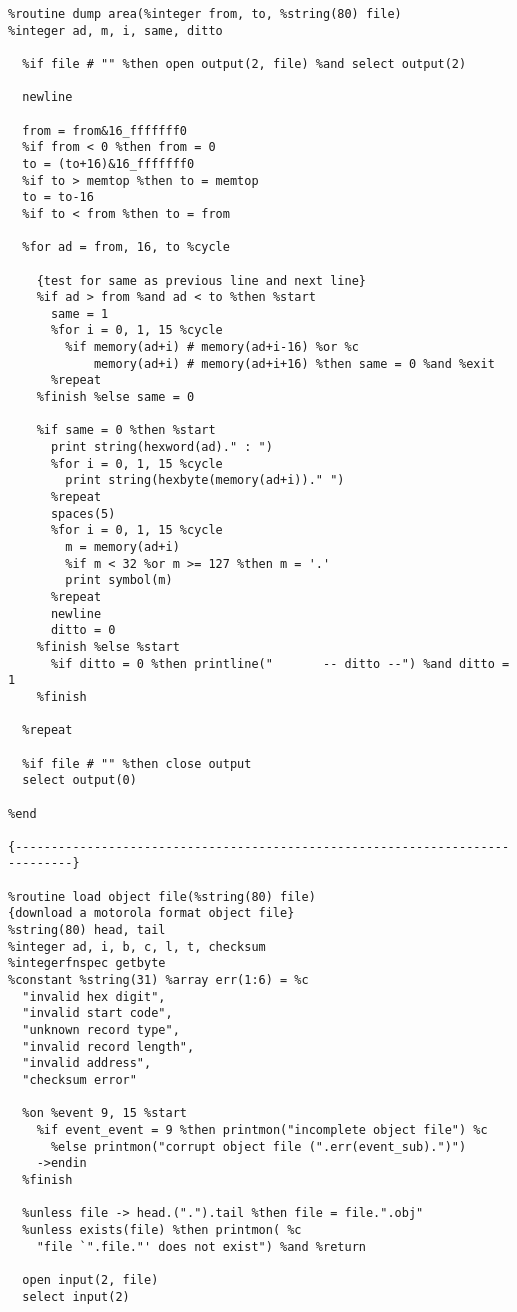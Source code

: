\begin{verbatim}
%routine dump area(%integer from, to, %string(80) file)
%integer ad, m, i, same, ditto

  %if file # "" %then open output(2, file) %and select output(2)

  newline

  from = from&16_fffffff0
  %if from < 0 %then from = 0
  to = (to+16)&16_fffffff0
  %if to > memtop %then to = memtop
  to = to-16
  %if to < from %then to = from

  %for ad = from, 16, to %cycle

    {test for same as previous line and next line}
    %if ad > from %and ad < to %then %start
      same = 1
      %for i = 0, 1, 15 %cycle
        %if memory(ad+i) # memory(ad+i-16) %or %c
            memory(ad+i) # memory(ad+i+16) %then same = 0 %and %exit
      %repeat
    %finish %else same = 0

    %if same = 0 %then %start
      print string(hexword(ad)." : ")
      %for i = 0, 1, 15 %cycle
        print string(hexbyte(memory(ad+i))." ")
      %repeat
      spaces(5)
      %for i = 0, 1, 15 %cycle
        m = memory(ad+i)
        %if m < 32 %or m >= 127 %then m = '.'
        print symbol(m)
      %repeat
      newline
      ditto = 0
    %finish %else %start
      %if ditto = 0 %then printline("       -- ditto --") %and ditto = 1
    %finish

  %repeat

  %if file # "" %then close output
  select output(0)

%end

{------------------------------------------------------------------------------}

%routine load object file(%string(80) file)
{download a motorola format object file}
%string(80) head, tail
%integer ad, i, b, c, l, t, checksum
%integerfnspec getbyte   
%constant %string(31) %array err(1:6) = %c
  "invalid hex digit",
  "invalid start code",
  "unknown record type",
  "invalid record length",
  "invalid address",
  "checksum error"

  %on %event 9, 15 %start
    %if event_event = 9 %then printmon("incomplete object file") %c
      %else printmon("corrupt object file (".err(event_sub).")")
    ->endin
  %finish

  %unless file -> head.(".").tail %then file = file.".obj"
  %unless exists(file) %then printmon( %c
    "file `".file."' does not exist") %and %return

  open input(2, file)
  select input(2)


\end{verbatim}

